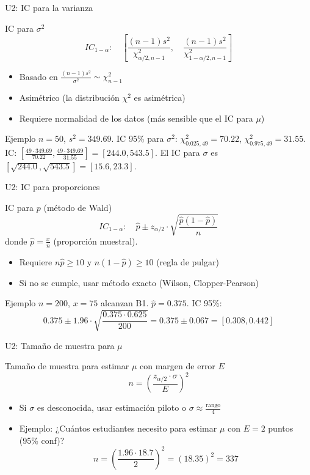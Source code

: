 \documentclass[aspectratio=169, 11pt]{beamer}
\begin{document}
\begin{frame}{U2: IC para la varianza}
\begin{block}{IC para $\sigma^2$}
$$IC_{1-\alpha}: \quad \left[\frac{(n-1)s^2}{\chi^2_{\alpha/2, n-1}}, \quad \frac{(n-1)s^2}{\chi^2_{1-\alpha/2, n-1}}\right]$$
\begin{itemize}
\item Basado en $\frac{(n-1)s^2}{\sigma^2} \sim \chi^2_{n-1}$
\item Asimétrico (la distribución $\chi^2$ es asimétrica)
\item Requiere normalidad de los datos (más sensible que el IC para $\mu$)
\end{itemize}
\end{block}

\begin{exampleblock}{Ejemplo}
\small
$n = 50$, $s^2 = 349.69$. IC 95\% para $\sigma^2$:
$\chi^2_{0.025, 49} = 70.22$, $\chi^2_{0.975, 49} = 31.55$.
IC: $\left[\frac{49 \cdot 349.69}{70.22}, \frac{49 \cdot 349.69}{31.55}\right] = [244.0, 543.5]$.
El IC para $\sigma$ es $[\sqrt{244.0}, \sqrt{543.5}] = [15.6, 23.3]$.
\end{exampleblock}
\end{frame}

\begin{frame}{U2: IC para proporciones}
\begin{block}{IC para $p$ (método de Wald)}
$$IC_{1-\alpha}: \quad \hat{p} \pm z_{\alpha/2} \cdot \sqrt{\frac{\hat{p}(1-\hat{p})}{n}}$$
donde $\hat{p} = \frac{x}{n}$ (proporción muestral).
\begin{itemize}
\item Requiere $n\hat{p} \geq 10$ y $n(1-\hat{p}) \geq 10$ (regla de pulgar)
\item Si no se cumple, usar método exacto (Wilson, Clopper-Pearson)
\end{itemize}
\end{block}

\begin{exampleblock}{Ejemplo}
\small
$n = 200$, $x = 75$ alcanzan B1. $\hat{p} = 0.375$. IC 95\%:
$$0.375 \pm 1.96 \cdot \sqrt{\frac{0.375 \cdot 0.625}{200}} = 0.375 \pm 0.067 = [0.308, 0.442]$$
\end{exampleblock}
\end{frame}

\begin{frame}{U2: Tama\~no de muestra para $\mu$}
\begin{block}{Tamaño de muestra para estimar $\mu$ con margen de error $E$}
$$n = \left(\frac{z_{\alpha/2} \cdot \sigma}{E}\right)^2$$
\begin{itemize}
\item Si $\sigma$ es desconocida, usar estimación piloto o $\sigma \approx \frac{\text{rango}}{4}$
\item Ejemplo: ¿Cuántos estudiantes necesito para estimar $\mu$ con $E = 2$ puntos (95\% conf)?
  $$n = \left(\frac{1.96 \cdot 18.7}{2}\right)^2 = (18.35)^2 = 337$$
\end{itemize}
\end{block}
\end{frame}
\end{document}
